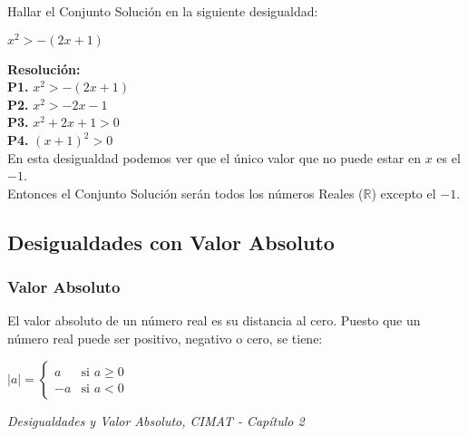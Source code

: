 \documentclass[12pt,a4paper]{book}
\begin{document}
{{ Hallar el Conjunto Solución en la siguiente desigualdad:
\begin{center}
 $ x^2 > -(2x+1)$
\end{center} 
\textbf{Resolución:}\\${ }$\\
\textbf{P1. } $x^2 > -(2x+1)$ \\
\textbf{P2. } $x^2 > -2x-1$ \\
\textbf{P3. } $x^2 +2x +1 > 0$ \\
\textbf{P4. } $(x+1)^2 > 0$ \\${ }$\\
En esta desigualdad podemos ver que el único valor que no puede estar en $x$ es el $-1$. \\${ }$\\Entonces el Conjunto Solución serán todos los números Reales ($\mathbb{R}$) excepto el $-1$.

\subsection{Desigualdades con Valor Absoluto}
\subsubsection{Valor Absoluto}
\begin{framed}\noindent
El valor absoluto de un número real es su distancia al cero. Puesto que un número real puede ser
positivo, negativo o cero, se tiene:

\begin{center}
$|a| = \begin{cases} a & \mbox{si } a\geq 0 \\ -a & \mbox{si } a<0 \end{cases}$
\end{center}

\begin{flushright}
\textit{{\scriptsize Desigualdades y Valor Absoluto, CIMAT - Capítulo 2}}
\end{flushright}
\vspace{-0.5cm}
\end{framed}
}}
\end{document}

